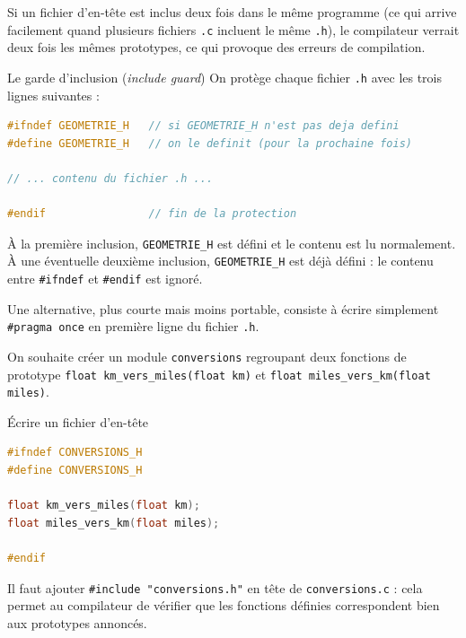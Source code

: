 Si un fichier d'en-tête est inclus deux fois dans le même programme (ce qui arrive facilement quand plusieurs fichiers \texttt{.c} incluent le même \texttt{.h}), le compilateur verrait deux fois les mêmes prototypes, ce qui provoque des erreurs de compilation.

\begin{UPSTIinfor}{Le garde d'inclusion (\emph{include guard})}
  On protège chaque fichier \texttt{.h} avec les trois lignes suivantes :
  \begin{lstlisting}[language=c,caption={Garde d'inclusion}]
#ifndef GEOMETRIE_H   // si GEOMETRIE_H n'est pas deja defini
#define GEOMETRIE_H   // on le definit (pour la prochaine fois)

// ... contenu du fichier .h ...

#endif                // fin de la protection
  \end{lstlisting}
  À la première inclusion, \texttt{GEOMETRIE\_H} est défini et le contenu est lu normalement. À une éventuelle deuxième inclusion, \texttt{GEOMETRIE\_H} est déjà défini : le contenu entre \texttt{\#ifndef} et \texttt{\#endif} est ignoré.

  Une alternative, plus courte mais moins portable, consiste à écrire simplement \texttt{\#pragma once} en première ligne du fichier \texttt{.h}.
\end{UPSTIinfor}

\begin{UPSTIactivite}
On souhaite créer un module \texttt{conversions} regroupant deux fonctions de prototype \texttt{float km\_vers\_miles(float km)} et \texttt{float miles\_vers\_km(float miles)}.

\end{UPSTIactivite}

\begin{UPSTIprofOnlyEnv}
\begin{UPSTIcorrectionP}{Écrire un fichier d'en-tête}
\begin{lstlisting}[language=c,caption={\texttt{conversions.h}}]
#ifndef CONVERSIONS_H
#define CONVERSIONS_H

float km_vers_miles(float km);
float miles_vers_km(float miles);

#endif
\end{lstlisting}
Il faut ajouter \texttt{\#include "conversions.h"} en tête de \texttt{conversions.c} : cela permet au compilateur de vérifier que les fonctions définies correspondent bien aux prototypes annoncés.
\end{UPSTIcorrectionP}
\end{UPSTIprofOnlyEnv}

